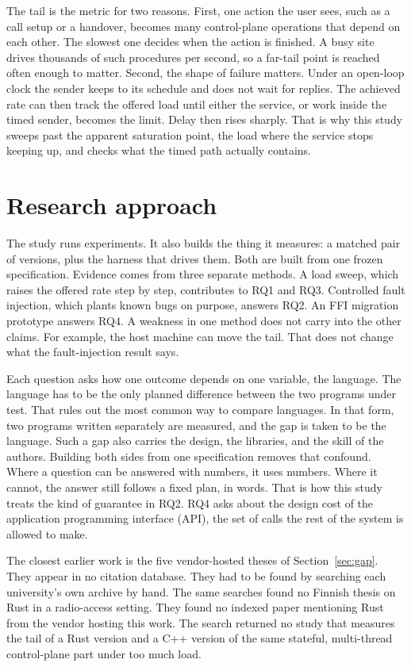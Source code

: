 \documentclass[english,oneside,a4paper,censored,csm,software-track-2020]{HYthesisML}
\begin{document}
The tail is the metric for two reasons.
First, one action the user sees, such as a call setup or a handover, becomes many control-plane operations that depend on each other.
The slowest one decides when the action is finished.
A busy site drives thousands of such procedures per second, so a far-tail point is reached often enough to matter.
Second, the shape of failure matters.
Under an open-loop clock the sender keeps to its schedule and does not wait for replies.
The achieved rate can then track the offered load until either the service, or work inside the timed sender, becomes the limit.
Delay then rises sharply.
That is why this study sweeps past the apparent saturation point, the load where the service stops keeping up, and checks what the timed path actually contains.

\section{Research approach}\label{sec:approach}
The study runs experiments. It also builds the thing it measures: a matched pair of versions, plus the harness that drives them.
Both are built from one frozen specification.
Evidence comes from three separate methods.
A load sweep, which raises the offered rate step by step, contributes to RQ1 and RQ3.
Controlled fault injection, which plants known bugs on purpose, answers RQ2.
An FFI migration prototype answers RQ4.
A weakness in one method does not carry into the other claims.
For example, the host machine can move the tail. That does not change what the fault-injection result says.

Each question asks how one outcome depends on one variable, the language.
The language has to be the only planned difference between the two programs under test.
That rules out the most common way to compare languages.
In that form, two programs written separately are measured, and the gap is taken to be the language.
Such a gap also carries the design, the libraries, and the skill of the authors.
Building both sides from one specification removes that confound.
Where a question can be answered with numbers, it uses numbers.
Where it cannot, the answer still follows a fixed plan, in words.
That is how this study treats the kind of guarantee in RQ2.
RQ4 asks about the design cost of the application programming interface (API), the set of calls the rest of the system is allowed to make.

The closest earlier work is the five vendor-hosted theses of Section~\ref{sec:gap}.
They appear in no citation database. They had to be found by searching each university's own archive by hand.
The same searches found no Finnish thesis on Rust in a radio-access setting.
They found no indexed paper mentioning Rust from the vendor hosting this work.
The search returned no study that measures the tail of a Rust version and a C++ version of the same stateful, multi-thread control-plane part under too much load.
\end{document}
